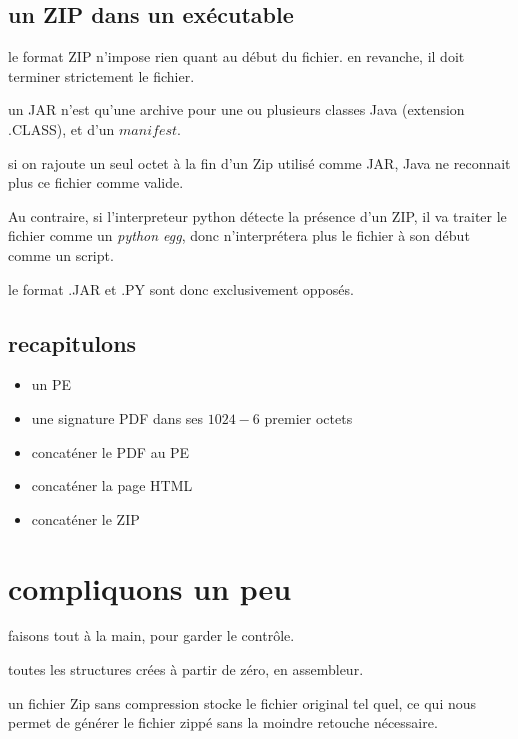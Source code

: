 \subsection{un ZIP dans un exécutable}
le format ZIP n'impose rien quant au début du fichier.
en revanche, il doit terminer strictement le fichier.

un JAR n'est qu'une archive pour une ou plusieurs classes Java (extension .CLASS), et d'un $manifest$.

si on rajoute un seul octet à la fin d'un Zip utilisé comme JAR, Java ne reconnait plus ce fichier comme valide.

Au contraire, si l'interpreteur python détecte la présence d'un ZIP, il va traiter le fichier comme un {\em python egg}, donc n'interprétera plus le fichier à son début comme un script.

le format .JAR et .PY sont donc exclusivement opposés.


\subsection{recapitulons}
\begin{itemize}
\item un PE
\item une signature PDF dans ses $1024 - 6$ premier octets
\item concaténer le PDF au PE
\item concaténer la page HTML
\item concaténer le ZIP
\end{itemize}

\section{compliquons un peu}
faisons tout à la main, pour garder le contrôle.

toutes les structures crées à partir de zéro, en assembleur.

un fichier Zip sans compression stocke le fichier original tel quel, ce qui nous permet de générer le fichier zippé sans la moindre retouche nécessaire.


